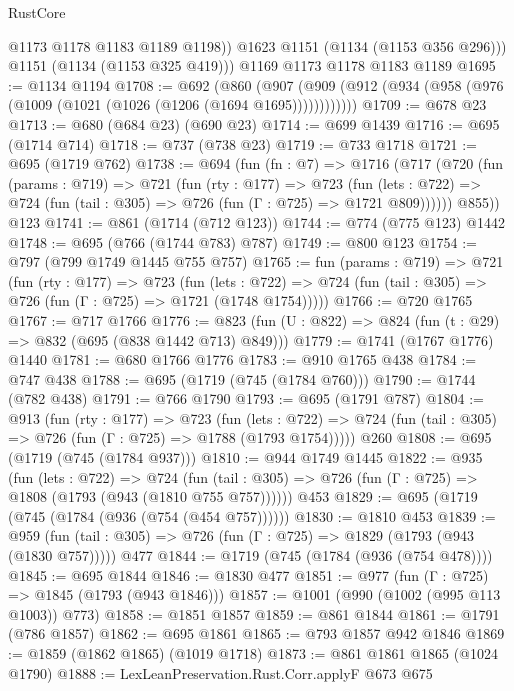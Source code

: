 \begin{lexlean}{RustCore}
\begin{coremodule}
{\begin{coremodule}
{{{{{{{{{            @1173
            @1178
            @1183
            @1189
            @1198))
        @1623
        @1151
        (@1134 (@1153 @356 @296)))
      @1151
      (@1134 (@1153 @325 @419)))
    @1169
    @1173
    @1178
    @1183
    @1189
@1695 := @1134 @1194
@1708 := @692
    (@860 (@907 (@909 (@912 (@934 (@958 (@976 (@1009 (@1021 (@1026 (@1206 (@1694 @1695))))))))))))
@1709 := @678 @23
@1713 := @680 (@684 @23) (@690 @23)
@1714 := @699 @1439
@1716 := @695 (@1714 @714)
@1718 := @737 (@738 @23)
@1719 := @733 @1718
@1721 := @695 (@1719 @762)
@1738 := @694
    (fun (fn : @7) =>
    @1716
      (@717
        (@720
          (fun (params : @719) =>
          @721
            (fun (rty : @177) =>
            @723
              (fun (lets : @722) =>
              @724 (fun (tail : @305) => @726 (fun (Γ : @725) => @1721 @809))))))
        @855))
    @123
@1741 := @861 (@1714 (@712 @123))
@1744 := @774 (@775 @123) @1442
@1748 := @695 (@766 (@1744 @783) @787)
@1749 := @800 @123
@1754 := @797 (@799 @1749 @1445 @755 @757)
@1765 := fun (params : @719) =>
  @721
    (fun (rty : @177) =>
    @723
      (fun (lets : @722) =>
      @724 (fun (tail : @305) => @726 (fun (Γ : @725) => @1721 (@1748 @1754)))))
@1766 := @720 @1765
@1767 := @717 @1766
@1776 := @823 (fun (U : @822) => @824 (fun (t : @29) => @832 (@695 (@838 @1442 @713) @849)))
@1779 := @1741 (@1767 @1776) @1440
@1781 := @680 @1766 @1776
@1783 := @910 @1765 @438
@1784 := @747 @438
@1788 := @695 (@1719 (@745 (@1784 @760)))
@1790 := @1744 (@782 @438)
@1791 := @766 @1790
@1793 := @695 (@1791 @787)
@1804 := @913
    (fun (rty : @177) =>
    @723
      (fun (lets : @722) =>
      @724 (fun (tail : @305) => @726 (fun (Γ : @725) => @1788 (@1793 @1754)))))
    @260
@1808 := @695 (@1719 (@745 (@1784 @937)))
@1810 := @944 @1749 @1445
@1822 := @935
    (fun (lets : @722) =>
    @724 (fun (tail : @305) => @726 (fun (Γ : @725) => @1808 (@1793 (@943 (@1810 @755 @757))))))
    @453
@1829 := @695 (@1719 (@745 (@1784 (@936 (@754 (@454 @757))))))
@1830 := @1810 @453
@1839 := @959 (fun (tail : @305) => @726 (fun (Γ : @725) => @1829 (@1793 (@943 (@1830 @757))))) @477
@1844 := @1719 (@745 (@1784 (@936 (@754 @478))))
@1845 := @695 @1844
@1846 := @1830 @477
@1851 := @977 (fun (Γ : @725) => @1845 (@1793 (@943 @1846)))
@1857 := @1001 (@990 (@1002 (@995 @113 @1003)) @773)
@1858 := @1851 @1857
@1859 := @861 @1844
@1861 := @1791 (@786 @1857)
@1862 := @695 @1861
@1865 := @793 @1857 @942 @1846
@1869 := @1859 (@1862 @1865) (@1019 @1718)
@1873 := @861 @1861 @1865 (@1024 @1790)
@1888 := LexLeanPreservation.Rust.Corr.applyF
    @673
    @675
}}}}}}}}}
\end{coremodule}}
\end{coremodule}
\end{lexlean}

